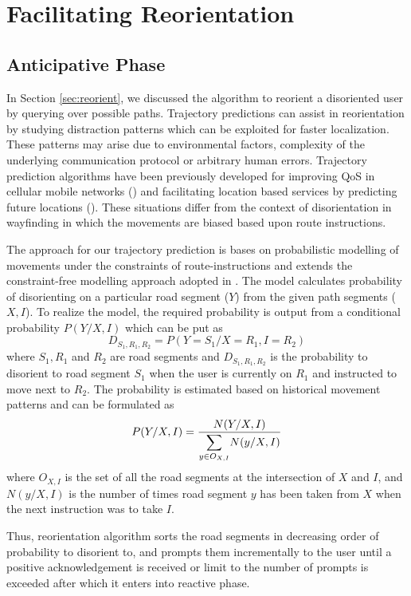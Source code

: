 \documentclass{iitkthesis}
\begin{document}
\section{Facilitating Reorientation}
\subsection{Anticipative Phase}
In Section \ref{sec:reorient}, we discussed the algorithm to reorient a disoriented user by querying over possible paths. Trajectory predictions can assist in reorientation by studying distraction patterns which can be exploited for faster localization. These patterns may arise due to environmental factors, complexity of the underlying communication protocol or arbitrary human errors. Trajectory prediction algorithms have been previously developed for improving QoS in cellular mobile networks (\cite{kyri}) and facilitating location based services by predicting future locations (\cite{karimi}). These situations differ from the context of disorientation in wayfinding in which the movements are biased based upon route instructions. 

The approach for our trajectory prediction is bases on probabilistic modelling of movements under the constraints of route-instructions and extends the constraint-free modelling approach adopted in \cite{liu}. The model calculates probability of disorienting on a particular road segment ($Y$) from the given path segments ($X,I$). To realize the model, the required probability is output from a conditional probability $P(Y/X,I)$ which can be put as
%
$$D_{S_1,R_1,R_2} = P(Y=S_1/X=R_1,I=R_2)$$
%
where $S_1,R_1$ and $R_2$ are road segments and $D_{S_1,R_1,R_2}$ is the probability to disorient to road segment $S_1$ when the user is currently on $R_1$ and instructed to move next to $R_2$. The probability is estimated based on historical movement patterns and can be formulated as
%
\[ \displaystyle P(Y/X,I) = \frac{N(Y/X,I)}{ \mathlarger{\sum}\limits_{y \in O_{X,I}} N(y/X,I)} \] 
%
where $O_{X,I}$ is the set of all the road segments at the intersection of $X$ and $I$, and $N(y/X,I)$ is the number of times road segment $y$ has been taken from $X$ when the next instruction was to take $I$. 

Thus, reorientation algorithm sorts the road segments in decreasing order of probability to disorient to, and prompts them incrementally to the user until a positive acknowledgement is received or limit to the number of prompts is exceeded after which it enters into reactive phase.
\end{document}
